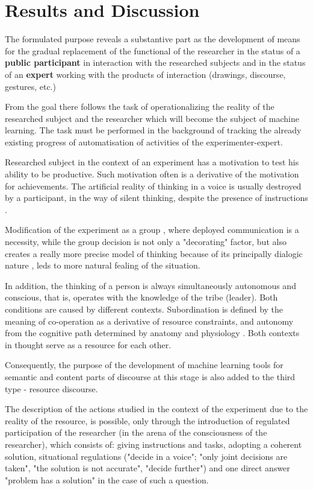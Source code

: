 \documentclass[conference]{IEEEtran}
\begin{document}
	\section{Results and Discussion}
	
	The formulated purpose reveals a substantive part as the development of means for the gradual replacement of the functional of the researcher in the status of a \textbf{public participant} in interaction with the researched subjects and in the status of an \textbf{expert} working with the products of interaction (drawings, discourse, gestures, etc.)
	
	From the goal there follows the task of operationalizing the reality of the researched subject and the researcher which will become the subject of machine learning. The task must be performed in the background of tracking the already existing progress of automatisation of activities of the experimenter-expert.
	
	Researched subject in the context of an experiment has a motivation to test his ability to be productive. Such motivation often is a derivative of the motivation for achievements. The artificial reality of thinking in a voice is usually destroyed by a participant, in the way of silent thinking, despite the presence of instructions \cite[178]{b18}.
	
	Modification of the experiment as a group \cite{b8}, where deployed communication is a necessity, while the group decision is not only a "decorating" factor, but also creates a really more precise model of thinking because of its principally dialogic nature \cite{b2}, leds to more natural fealing of the situation.
	
	In addition, the thinking of a person is always simultaneously autonomous and conscious, that is, operates with the knowledge of the tribe (leader). Both conditions are caused by different contexts. Subordination is defined by the meaning of co-operation as a derivative of resource constraints, and autonomy from the cognitive path determined by anatomy and physiology \cite{b15}. Both contexts in thought serve as a resource for each other.
	
	Consequently, the purpose of the development of  machine learning tools for semantic and content parts of discourse at this stage is also added to the third type - resource discourse.
	
	The description of the actions studied in the context of the experiment due to the reality of the resource, is possible, only through the introduction of regulated participation of the researcher (in the arena of the consciousness of the researcher), which consists of: giving instructions and tasks, adopting a coherent solution, situational regulations ("decide in a voice"; "only joint decisions are taken", "the solution is not accurate", "decide further") and one direct answer "problem has a solution" in the case of such a question.
	
\end{document}
